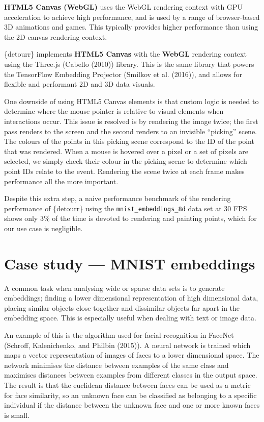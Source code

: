 \textbf{HTML5 Canvas (WebGL)} uses the WebGL rendering context with GPU acceleration to achieve high performance, and is used by a range of browser-based 3D animations and games. This typically provides higher performance than using the 2D canvas rendering context.

\{detourr\} implements \textbf{HTML5 Canvas} with the \textbf{WebGL} rendering context using the Three.js (Cabello (2010)) library. This is the same library that powers the TensorFlow Embedding Projector (Smilkov et al. (2016)), and allows for flexible and performant 2D and 3D data visuals.

One downside of using HTML5 Canvas elements is that custom logic is needed to determine where the mouse pointer is relative to visual elements when interactions occur. This issue is resolved is by rendering the image twice; the first pass renders to the screen and the second renders to an invisible ``picking'' scene. The colours of the points in this picking scene correspond to the ID of the point that was rendered. When a mouse is hovered over a pixel or a set of pixels are selected, we simply check their colour in the picking scene to determine which point IDs relate to the event. Rendering the scene twice at each frame makes performance all the more important.

Despite this extra step, a naive performance benchmark of the rendering performance of \{detourr\} using the \texttt{mnist\_embeddings\_8d} data set at 30 FPS shows only 3\% of the time is devoted to rendering and painting points, which for our use case is negligible.

\pagebreak

\hypertarget{ch:casestudy}{%
\section{Case study --- MNIST embeddings}\label{ch:casestudy}}

A common task when analysing wide or sparse data sets is to generate embeddings; finding a lower dimensional representation of high dimensional data, placing similar objects close together and dissimilar objects far apart in the embedding space. This is especially useful when dealing with text or image data.

An example of this is the algorithm used for facial recognition in FaceNet (Schroff, Kalenichenko, and Philbin (2015)). A neural network is trained which maps a vector representation of images of faces to a lower dimensional space. The network minimises the distance between examples of the same class and maximises distances between examples from different classes in the output space. The result is that the euclidean distance between faces can be used as a metric for face similarity, so an unknown face can be classified as belonging to a specific individual if the distance between the unknown face and one or more known faces is small.

